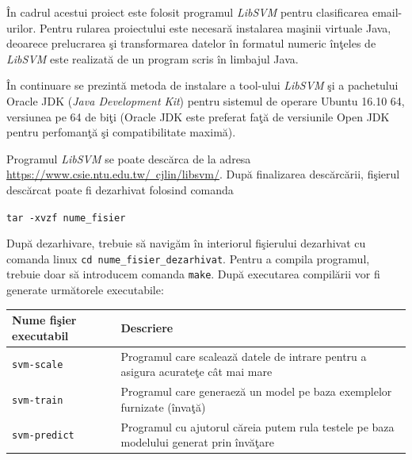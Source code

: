 \documentclass[a4paper,12pt]{report}
\begin{document}
  \par
  \^In cadrul acestui proiect este folosit programul \textit{LibSVM} pentru clasificarea email-urilor. Pentru rularea
  proiectului este necesar\u a instalarea ma\c sinii virtuale Java, deoarece prelucrarea \c si transformarea datelor
  \^in formatul numeric \^in\c teles de \textit{LibSVM} este realizat\u a de un program scris \^in limbajul Java.
  
  \^In continuare se prezint\u a metoda de instalare a tool-ului \textit{LibSVM} \c si a pachetului Oracle JDK
  (\textit{Java Development Kit})
  pentru sistemul de operare Ubuntu 16.10 64, versiunea pe 64 de bi\c ti (Oracle JDK este preferat fa\c t\u a de 
  versiunile Open JDK pentru perfoman\c t\u a \c si compatibilitate maxim\u a).
  
  \par
  Programul \textit{LibSVM} se poate desc\u arca de la adresa 
  \href{https://www.csie.ntu.edu.tw/~cjlin/libsvm/}{https://www.csie.ntu.edu.tw/~cjlin/libsvm/}.
  Dup\u a finalizarea desc\u arc\u arii, fi\c sierul desc\u arcat poate fi dezarhivat folosind comanda
  \begin{center}
    \verb|tar -xvzf nume_fisier|
  \end{center}

  \par
  Dup\u a dezarhivare, trebuie s\u a navig\u am \^in interiorul fi\c sierului dezarhivat cu comanda linux 
  \verb|cd nume_fisier_dezarhivat|. Pentru a compila programul, trebuie doar s\u a introducem comanda 
  \verb|make|. Dup\u a executarea 
  compil\u arii vor fi generate urm\u atorele executabile:
  
  \begin{center}
    \begin{tabular}{ | l | p{8cm} | }
      \hline
      \textbf{Nume fi\c sier executabil} & \textbf{Descriere} \\
      \hline
      
      \verb|svm-scale| & Programul care scaleaz\u a datele de intrare pentru a asigura acurate\c te c\^at mai mare \\
      \hline
      
      \verb|svm-train| & Programul care generaez\u a un model pe baza exemplelor furnizate (\^inva\c t\u a) \\
      \hline
      
      \verb|svm-predict| & Programul cu ajutorul c\u areia putem rula testele pe baza 
	modelului generat prin \^inv\u a\c tare \\
      \hline      
    \end{tabular}
  \end{center}
\end{document}
